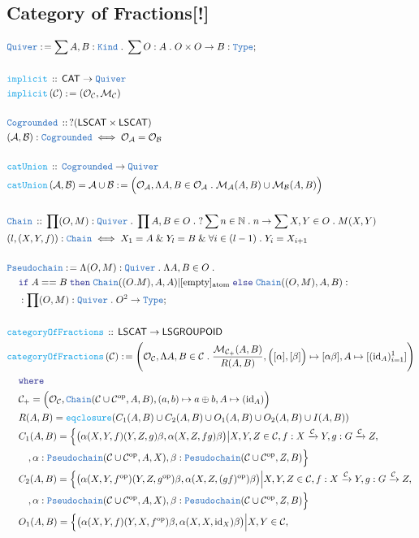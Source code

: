 \documentclass[12pt]{scrartcl}
\newcommand{\TYPE}[1]{\textcolor{NavyBlue}{\mathtt{#1}}}
\newcommand{\FUNC}[1]{\textcolor{Cerulean}{\mathtt{#1}}}
\newcommand{\LOGIC}[1]{\textcolor{Blue}{\mathtt{#1}}}
\renewcommand{\.}{\; . \;}
\newcommand{\de}{: \kern 0.1pc =}
\newcommand{\where}{\LOGIC{where}}
\newcommand{\If}{\LOGIC{if} \;}
\newcommand{\Then}{ \; \LOGIC{then} \;}
\newcommand{\Else}{\; \LOGIC{else} \;}
\newcommand{\Act}[1]{\left( #1 \right)}
\newcommand{\DeclareType}[2]{& \TYPE{#1} \, :: \, #2 \\}
\newcommand{\DefineType}[3]{& #1 : \TYPE{#2} \iff #3 \\}
\newcommand{\DeclareFunc}[2]{& \FUNC{#1} \, :: \, #2 \\}
\newcommand{\DefineFunc}[3]{&  \FUNC{#1}\Act{#2} \de #3 \\}
\newcommand{\DefineNamedFunc}[4]{&  \FUNC{#1}\Act{#2} = #3 \de #4 \\}
\newcommand{\NewLine}{\\ & \kern 1pc}
\newcommand{\Page}[1]{ \begin{align*} #1 \end{align*}   }
\renewcommand{\And}{\; \& \;}
\newcommand{\Type}{\TYPE{Type}}
\newcommand{\Class}{\TYPE{Kind}}
\newcommand{\Nat}{\mathbb{N} }
\DeclareMathOperator*{\id}{id}
\newcommand{\Mor}{\mathcal{M}}
\newcommand{\Obj}{\mathcal{O}}
\newcommand{\Arrow}{\xrightarrow}
\newcommand{\Conclude}[3]{& #1 \de #2 : #3; \\}
\newcommand{\op}{\mathrm{op}}
\newcommand{\C}{\mathcal{C}}
\newcommand{\A}{\mathcal{A}}
\newcommand{\B}{\mathcal{B}}
\newcommand{\CAT}{\mathsf{CAT}}
\begin{document}
\subsection{Category of Fractions[!]}
\Page{	
	\Conclude{\TYPE{Quiver}}{\sum A,B : \Class \. \sum O : A \. O \times O \to B}{\Type}
	\\
	\DeclareFunc{implicit}{\CAT \to \TYPE{Quiver}}
	\DefineFunc{implicit}{\C}{ (\Obj_\C,\Mor_\C) }
	\\
	\DeclareType{Cogrounded}{?(\mathsf{LSCAT} \times \mathsf{LSCAT})}
	\DefineType{(\A,\B)}{Cogrounded}{ \Obj_\A = \Obj_\B  }
	\\
	\DeclareFunc{catUnion}{\TYPE{Cogrounded} \to \TYPE{Quiver}}
	\DefineNamedFunc{catUnion}{\A,\B}{\A \cup \B}
	{\Big(\Obj_\A, \Lambda A,B \in \Obj_\A \. \Mor_\A(A,B ) \cup\Mor_\B(A,B) \Big)}
	\\
	\DeclareType{Chain}{\prod (O,M) : \TYPE{Quiver} \. \prod A,B \in O \. 
		?\sum n \in \Nat \. n \to \sum X,Y \in O \. M(X,Y) }
	\DefineType{(l,(X,Y,f))}{Chain}{X_1 = A \And Y_l = B \And \forall i \in (l-1) \. Y_i = X_{i+1}}
	\\
	\Conclude{\TYPE{Pseudochain}}{ \Lambda (O,M) : \TYPE{Quiver} \. \Lambda A, B \in O \.
		 \NewLine
		 \If A == B \Then \TYPE{Chain}((O.M),A,A) | [ \text{empty} ]_{\mathrm{atom}} \Else \TYPE{Chain}((O,M),A,B)}
		 { \NewLine : \prod (O,M) : \TYPE{Quiver} \. O^2 \to \Type }
	\\
	\DeclareFunc{categoryOfFractions}{\mathsf{LSCAT} \to \mathsf{LSGROUPOID}}
	\DefineFunc{categoryOfFractions}{\C}
	{ 
		\Bigg(   \Obj_\C, \Lambda A,B \in \C \. \frac{ \Mor_{\C_+}(A,B) }{R(A,B)}, 
			\Big([\alpha], [\beta]\Big) \mapsto [\alpha\beta] , A \mapsto [({\id}_{A})^1_{i=1}]
		\Bigg) \NewLine \where \NewLine 
		\C_+ = \Big( \Obj_\C, \TYPE{Chain}(\C \cup \C^\op,A,B), 
			(a,b) \mapsto a \oplus b, A \mapsto ({\id}_A) \Big) \NewLine
		R(A,B) = \FUNC{eqclosure}(C_1(A,B) \cup C_2(A,B) \cup O_1(A,B) \cup O_2(A,B) \cup I(A,B)) \NewLine
		C_1(A,B) = \Big\{ \big(\alpha (X,Y,f)(Y,Z,g) \beta, \alpha(X,Z,fg)\beta\big) \big| X,Y,Z \in \C, 
			f : X \Arrow{\C} Y, g : G \Arrow{\C} Z, \NewLine \quad, 
			\alpha : \TYPE{Pseudochain}(\C \cup \C^\op,A,X), \beta : \TYPE{Pesudochain}(\C \cup \C^\op, Z, B) \Big\}
		\NewLine
		C_2(A,B) = \Big\{ \big(\alpha (X,Y,f^\op)(Y,Z,g^\op) \beta, \alpha(X,Z,(gf)^\op)\beta\big) \Big| X,Y,Z \in \C, 
			f : X \Arrow{\C} Y, g : G \Arrow{\C} Z, \NewLine \quad, 
			\alpha : \TYPE{Pseudochain}(\C \cup \C^\op,A,X), \beta : \TYPE{Pesudochain}(\C \cup \C^\op, Z, B) \Big\}
		\NewLine
		O_1(A,B) = \Big\{ \big(\alpha (X,Y,f)(Y,X,f^\op) \beta, \alpha(X,X,{\id}_X)\beta\big) \Big| X,Y \in \C, 
}}
\end{document}
